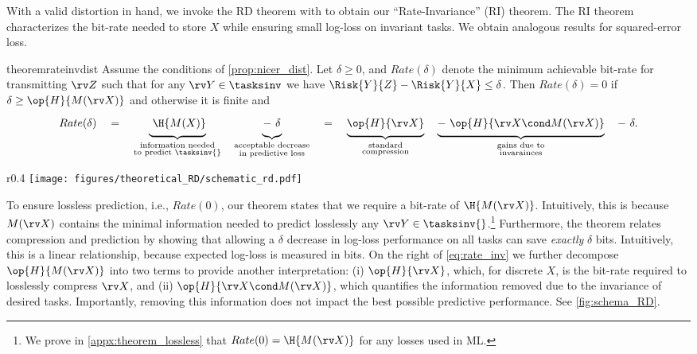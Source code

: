 \documentclass[final]{article}
\begin{document}
With a valid distortion in hand, we invoke the RD theorem with \disttextinv{} to obtain our ``Rate-Invariance'' (RI) theorem.
The RI theorem characterizes the bit-rate needed to store $X$ while ensuring small log-loss on invariant tasks.
We obtain analogous results for squared-error loss.
\begin{restatable}{theorem}{rateinvdist}\label{thm:rate_invariance_distortion}
Assume the conditions of \cref{prop:nicer_dist}. 
Let $\delta \geq 0$, and $Rate(\delta)$ denote the minimum achievable bit-rate for transmitting $\rv Z$ such that for any $\rv Y \in \tasksinv$ we have $\Risk{Y}{Z} - \Risk{Y}{X} \leq \delta$.
Then $Rate(\delta)=0$ if $\delta \geq \op{H}{M(\rv X)}$ and otherwise it is finite and
\begin{align}\label{eq:rate_inv}
Rate(\delta) \quad = \quad
\underbrace{\ \vphantom{\sum}\H{M(X)} }_{\substack{\text{information needed} \\ \text{to predict } \tasksinv{}}}
\quad
\underbrace{-\ \vphantom{\sum}\delta }_{\substack{\text{acceptable decrease} \\ \text{in predictive loss}}}
\quad = \quad
\underbrace{\vphantom{\sum} \op{H}{\rv X} }_{\substack{\text{standard} \\ \text{compression}}}
\quad
\underbrace{-\ \vphantom{\sum} \op{H}{\rv X \cond M(\rv X)} }_{\substack{\text{gains due to} \\ \text{invarainces}}}
\quad
-\ \delta.
\end{align}
\end{restatable}
\begin{wrapfigure}{r}{0.4\textwidth}
\vspace{-1\baselineskip}
 \centering
 \texttt{[image: figures/theoretical\_RD/schematic\_rd.pdf]}
 \vspace{-1\baselineskip}
 \caption{Rate-Invariance function.}
\label{fig:schema_RD}
\vspace{-1\baselineskip}
\end{wrapfigure}
 To ensure lossless prediction, i.e., $Rate(0)$, our theorem states that we require a bit-rate of $\H{M(\rv X)}$.
Intuitively, this is because $M(\rv X)$ contains the minimal information needed to predict losslessly any $\rv Y \in \tasksinv{}$.\footnote{
We prove in \cref{appx:theorem_lossless} that $Rate(0)=\H{M(\rv X)}$ for any losses used in ML.
}
Furthermore, the theorem relates compression and prediction by showing that allowing a $\delta$ decrease in log-loss performance on all tasks can save \textit{exactly} $\delta$ bits. 
Intuitively, this is a linear relationship, because expected log-loss is measured in bits.
On the right of \cref{eq:rate_inv} we further decompose $\op{H}{M(\rv X)}$ into two terms to provide another interpretation:
(i) $\op{H}{\rv X}$, which, for discrete $X$, is the bit-rate required to losslessly compress $\rv X$, and (ii) $\op{H}{\rv X \cond M(\rv X)}$, which quantifies the information removed due to the invariance of desired tasks.
Importantly, removing this information does not impact the best possible predictive performance.
See \cref{fig:schema_RD}.
\end{document}
